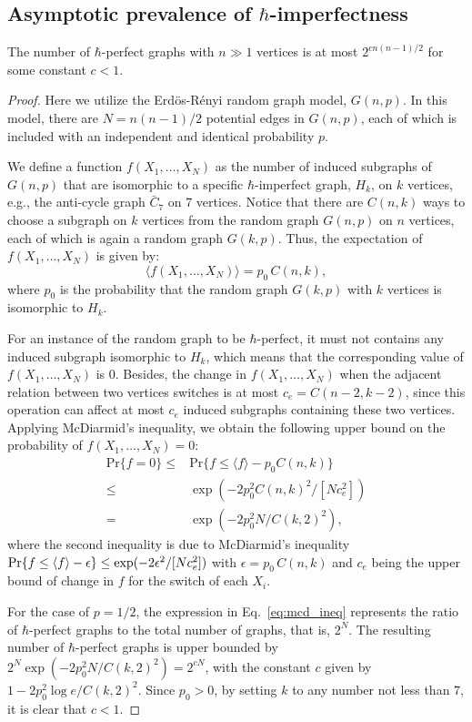 \subsection{Asymptotic prevalence of $\hbar$-imperfectness}
\label{ssec:asym}
\begin{theorem}
	The number of $\hbar$-perfect graphs with $n\gg 1$ vertices is at most $2^{c n(n-1)/2}$ for some constant $c<1$.
\end{theorem}
\begin{proof}
	Here we utilize the Erd\"{o}s-R\'{e}nyi random graph model, $G(n,p)$. In this model, there are $N = n(n-1)/2$ potential edges in $G(n,p)$, each of which is included with an independent and identical probability $p$. 

	We define a function $f(X_1, \ldots, X_N)$ as the number of induced subgraphs of $G(n,p)$ that are isomorphic to a specific $\hbar$-imperfect graph, $H_k$, on $k$ vertices, e.g., the anti-cycle graph $\bar{C}_7$ on $7$ vertices. 
	Notice that there are $C(n,k)$ ways to choose a subgraph on $k$ vertices from the random graph $G(n,p)$ on $n$ vertices, each of which is again a random graph $G(k,p)$. Thus, the expectation of $f(X_1, \ldots, X_N)$ is given by:
\begin{equation}
	\langle f(X_1, \ldots, X_N) \rangle = p_0\, C(n,k),
\end{equation}
where $p_0$ is the probability that the random graph $G(k,p)$ with $k$ vertices is isomorphic to $H_k$.

For an instance of the random graph to be $\hbar$-perfect, it must not contains any induced subgraph isomorphic to $H_k$, which means that the corresponding value of $f(X_1,\ldots,X_N)$ is $0$. Besides, the change in $f(X_1,\ldots,X_N)$ when the adjacent relation between two vertices switches is at most $c_e = C(n-2,k-2)$, since this operation can affect at most $c_e$ induced subgraphs containing these two vertices. Applying McDiarmid's inequality, we obtain the following upper bound on the probability of $f(X_1,\ldots,X_N) = 0$:
\begin{equation}\label{eq:mcd_ineq}
\begin{aligned}
	\text{Pr}\{f=0\} \le& \text{Pr}\{f\le \langle  f\rangle - p_0 C(n,k)\}\\
	\le& \exp({-2p_0^2 C(n,k)^2/[N c_e^2]})\\
	=& \exp({-2p_0^2 N/C(k,2)^2}),
\end{aligned}
\end{equation}
where the second inequality is due to McDiarmid's inequality ${\rm Pr}\{f\le \langle f\rangle - \epsilon\} \le \exp(-2\epsilon^2/[N c_e^2])$ with $\epsilon=p_0\, C(n,k)$ and $c_e$ being the upper bound of change in $f$ for the switch of each $X_i$.

For the case of $p = 1/2$, the expression in Eq.~\eqref{eq:mcd_ineq} represents the ratio of $\hbar$-perfect graphs to the total number of graphs, that is, $2^N$. The resulting number of $\hbar$-perfect graphs is upper bounded by $2^N  \exp(-{2p_0^2 N/C(k,2)^2} ) = 2^{c  N}$, with the constant $c$ given by
$1 - 2 p_0^2 \log e/C(k,2)^2$.
Since $p_0 > 0$, by setting $k$ to any number not less than $7$, it is clear that $c < 1$.
\end{proof}
